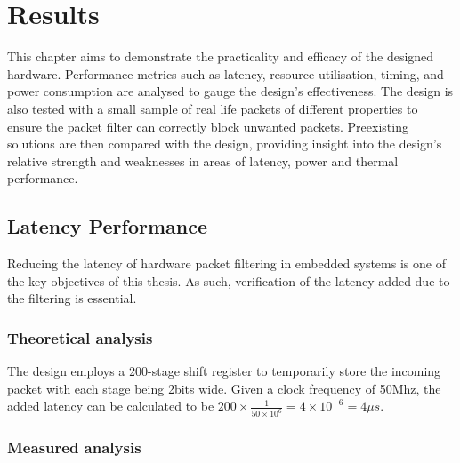 
\chapter[Results]{Results}
\label{Chap:label}	%
\pagestyle{headings}

This chapter aims to demonstrate the practicality and efficacy of the designed hardware. Performance metrics such as latency, resource utilisation, timing, and power consumption are analysed to gauge the design's effectiveness. The design is also tested with a small sample of real life packets of different properties to ensure the packet filter can correctly block unwanted packets. Preexisting solutions are then compared with the design, providing insight into the design's relative strength and weaknesses in areas of latency, power and thermal performance.



\section{Latency Performance}

Reducing the latency of hardware packet filtering in embedded systems is one of the key objectives of this thesis. As such, verification of the latency added due to the filtering is essential.

\subsection{Theoretical analysis}
The design employs a 200-stage shift register to temporarily store the incoming packet with each stage being 2bits wide. Given a clock frequency of 50Mhz, the added latency can be calculated to be $200 \times \frac{1}{50\times 10^6} = 4 \times 10^{-6} = 4\mu s$.

\subsection{Measured analysis}


